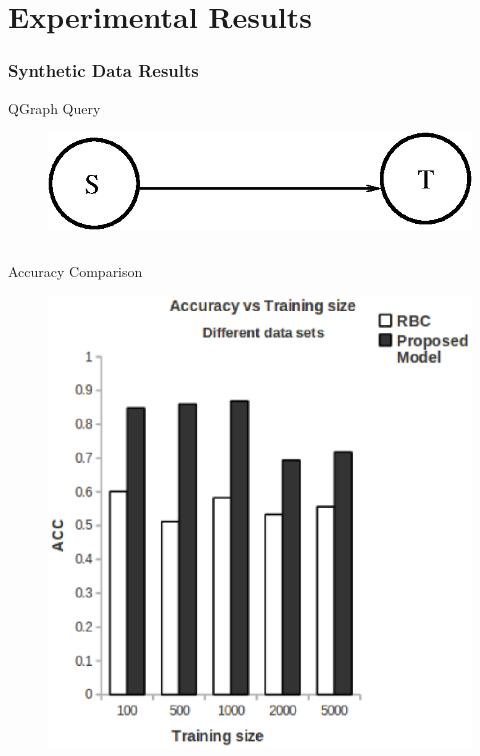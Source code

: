 \documentclass[10pt, blue,subsection=true, compress]{beamer}
\begin{document}
\section{Experimental Results}
\begin{frame}\frametitle{Synthetic Data Results}
\begin{block}{QGraph Query}
\begin{figure}[htbp]
\centering
\includegraphics[scale=0.3]{img/container1d.eps}
\end{figure}
\end{block}
\begin{columns}[t]
\begin{block}{Accuracy Comparison}
\begin{figure}[htbp]
\centering
\includegraphics[scale=0.25]{img/ex1-acc.eps}
\end{figure}
\end{block}

\end{columns}
\end{frame}
\end{document}
